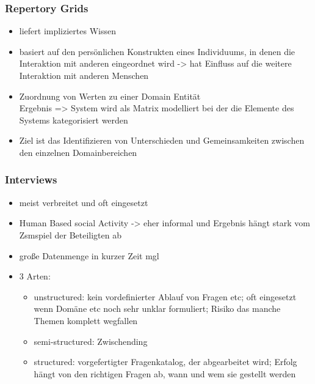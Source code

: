 \subsubsection{Repertory Grids}
\begin{itemize}
	\item liefert impliziertes Wissen
	\item basiert auf den persönlichen Konstrukten eines Individuums, in denen die Interaktion mit anderen eingeordnet wird -> hat Einfluss auf die weitere Interaktion mit anderen Menschen
	\item Zuordnung von Werten zu einer Domain Entität\\
	Ergebnis => System wird als Matrix modelliert bei der die Elemente des Systems kategorisiert werden
	\item Ziel ist das Identifizieren von Unterschieden und Gemeinsamkeiten zwischen den einzelnen Domainbereichen
\end{itemize}

\subsubsection{Interviews}
\begin{itemize}
	\item meist verbreitet und oft eingesetzt
	\item Human Based social Activity -> eher informal und Ergebnis hängt stark vom Zsmspiel der Beteiligten ab
	\item große Datenmenge in kurzer Zeit mgl
	\item 3 Arten:
	\begin{itemize}
		\item unstructured: kein vordefinierter Ablauf von Fragen etc; oft eingesetzt wenn Domäne etc noch sehr unklar formuliert; Risiko das manche Themen komplett wegfallen
		\item semi-structured: Zwischending
		\item structured: vorgefertigter Fragenkatalog, der abgearbeitet wird; Erfolg hängt von den richtigen Fragen ab, wann und wem sie gestellt werden
	\end{itemize}
\end{itemize}

